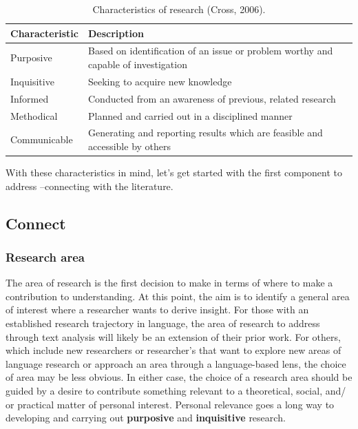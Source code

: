 \documentclass[
]{article}
\begin{document}
\begin{table}

\caption{\label{tab:fr-cross-research-char-table}Characteristics of research (Cross, 2006).}
\centering
\begin{tabular}[t]{ll}
\toprule
Characteristic & Description\\
\midrule
Purposive & Based on identification of an issue or problem worthy and capable of investigation\\
Inquisitive & Seeking to acquire new knowledge\\
Informed & Conducted from an awareness of previous, related research\\
Methodical & Planned and carried out in a disciplined manner\\
Communicable & Generating and reporting results which are feasible and accessible by others\\
\bottomrule
\end{tabular}
\end{table}

With these characteristics in mind, let's get started with the first component to address --connecting with the literature.

\hypertarget{connect}{%
\subsection{Connect}\label{connect}}

\hypertarget{research-area}{%
\subsubsection{Research area}\label{research-area}}

The area of research is the first decision to make in terms of where to make a contribution to understanding. At this point, the aim is to identify a general area of interest where a researcher wants to derive insight. For those with an established research trajectory in language, the area of research to address through text analysis will likely be an extension of their prior work. For others, which include new researchers or researcher's that want to explore new areas of language research or approach an area through a language-based lens, the choice of area may be less obvious. In either case, the choice of a research area should be guided by a desire to contribute something relevant to a theoretical, social, and/ or practical matter of personal interest. Personal relevance goes a long way to developing and carrying out \textbf{purposive} and \textbf{inquisitive} research.
\end{document}
